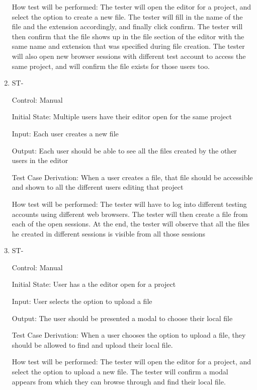 \documentclass[12pt, titlepage]{article}
\newcounter{TESTID}
\newcommand\TESTNUM{\stepcounter{TESTID}\theTESTID}
\begin{document}
\begin{enumerate}
		How test will be performed: The tester will open the editor for a project, and select the option to create a new file. The tester will fill in the name of the file and the extension accordingly, and finally click confirm. The tester will then confirm that the file shows up in the file section of the editor with the same name and extension that was specified during file creation. The tester will also open new browser sessions with different test account to access the same project, and will confirm the file exists for those users too.
		
		\item{ST-\TESTNUM\\}
		
		Control: Manual
		
		Initial State: Multiple users have their editor open for the same project
		
		Input: Each user creates a new file
		
		Output: Each user should be able to see all the files created by the other users in the editor
		
		Test Case Derivation: When a user creates a file, that file should be accessible and shown to all the different users editing that project
		
		How test will be performed: The tester will have to log into different testing accounts using different web browsers. The tester will then create a file from each of the open sessions. At the end, the tester will observe that all the files he created in different sessions is visible from all those sessions
		
		\item{ST-\TESTNUM\\}
		
		Control: Manual
		
		Initial State: User has a the editor open for a project
		
		Input: User selects the option to upload a file
		
		Output: The user should be presented a modal to choose their local file
		
		Test Case Derivation: When a user chooses the option to upload a file, they should be allowed to find and upload their local file.
		
		How test will be performed: The tester will open the editor for a project, and select the option to upload a new file. The tester will confirm a modal appears from which they can browse through and find their local file.
		

\end{enumerate}
\end{document}
